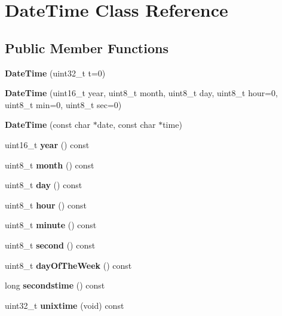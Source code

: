 \hypertarget{class_date_time}{}\section{Date\+Time Class Reference}
\label{class_date_time}
\subsection*{Public Member Functions}
\begin{DoxyCompactItemize}
\item 
\mbox{\label{class_date_time_af42f356752ec542faf262f485bd44a0b}} 
{\bfseries Date\+Time} (uint32\+\_\+t t=0)
\item 
\mbox{\label{class_date_time_aad62a6709a1e65e6860b1efaf8c347e9}} 
{\bfseries Date\+Time} (uint16\+\_\+t year, uint8\+\_\+t month, uint8\+\_\+t day, uint8\+\_\+t hour=0, uint8\+\_\+t min=0, uint8\+\_\+t sec=0)
\item 
\mbox{\label{class_date_time_aabeb5303c98a004439fe337bb5f5da63}} 
{\bfseries Date\+Time} (const char $\ast$date, const char $\ast$time)
\item 
\mbox{\label{class_date_time_a04bc8f3d3452bf8fcc5f1e82d86d7fe8}} 
uint16\+\_\+t {\bfseries year} () const
\item 
\mbox{\label{class_date_time_a10d35aa20ebb179cdb4b61f90dfcfe74}} 
uint8\+\_\+t {\bfseries month} () const
\item 
\mbox{\label{class_date_time_a6e653eaef31e4956ee9bf67b4874a9a8}} 
uint8\+\_\+t {\bfseries day} () const
\item 
\mbox{\label{class_date_time_ac17441fb0c669bcf3be5de278335e8d0}} 
uint8\+\_\+t {\bfseries hour} () const
\item 
\mbox{\label{class_date_time_a8dac4d21cf40f1b6f1ec5973024709ed}} 
uint8\+\_\+t {\bfseries minute} () const
\item 
\mbox{\label{class_date_time_adacdb3c0984bc73c2b48e5d1995a6c01}} 
uint8\+\_\+t {\bfseries second} () const
\item 
\mbox{\label{class_date_time_a958229f0d6a46d092658028d25a9e65c}} 
uint8\+\_\+t {\bfseries day\+Of\+The\+Week} () const
\item 
\mbox{\label{class_date_time_adae8d9c0249f99944bcec7701bd2937e}} 
long {\bfseries secondstime} () const
\item 
\mbox{\label{class_date_time_ae4629e7b2ffeac4a0c8f8c3f9c545990}} 
uint32\+\_\+t {\bfseries unixtime} (void) const
\end{DoxyCompactItemize}
